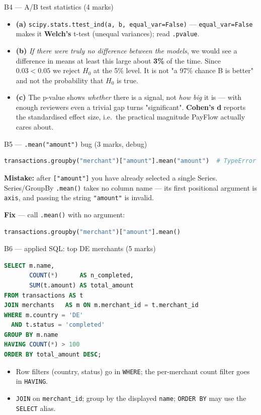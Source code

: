 \documentclass[aspectratio=169,11pt]{beamer}
\begin{document}
\begin{frame}[fragile]{B4 --- A/B test statistics \hfill (4 marks)}
\begin{itemize}
  \item \textbf{(a)} \texttt{scipy.stats.ttest\_ind(a, b, equal\_var=False)} --- \texttt{equal\_var=False} makes it \textbf{Welch's} t-test (unequal variances); read \texttt{.pvalue}.
  \item \textbf{(b)} \emph{If there were truly no difference between the models}, we would see a difference in means at least this large about \textbf{3\%} of the time. Since $0.03 < 0.05$ we reject $H_0$ at the 5\% level. It is \textcolor{cred}{not} "a 97\% chance B is better" and not the probability that $H_0$ is true.
  \item \textbf{(c)} The p-value shows \emph{whether} there is a signal, not \emph{how big} it is --- with enough reviewers even a trivial gap turns "significant". \textbf{Cohen's d} reports the standardised effect size, i.e.\ the practical magnitude PayFlow actually cares about.
\end{itemize}
\end{frame}

\begin{frame}[fragile]{B5 --- \texttt{.mean("amount")} bug \hfill (3 marks, debug)}
\begin{lstlisting}[language=Python]
transactions.groupby("merchant")["amount"].mean("amount")  # TypeError
\end{lstlisting}
\textbf{Mistake:} after \texttt{["amount"]} you have already selected a single Series. Series/GroupBy \texttt{.mean()} takes no column name --- its first positional argument is \texttt{axis}, and passing the string \texttt{"amount"} is invalid.
\medskip

\textbf{Fix} --- call \texttt{.mean()} with no argument:
\begin{lstlisting}[language=Python]
transactions.groupby("merchant")["amount"].mean()
\end{lstlisting}
\end{frame}

\begin{frame}[fragile]{B6 --- applied SQL: top DE merchants \hfill (5 marks)}
\begin{lstlisting}[language=SQL]
SELECT m.name,
       COUNT(*)      AS n_completed,
       SUM(t.amount) AS total_amount
FROM transactions AS t
JOIN merchants   AS m ON m.merchant_id = t.merchant_id
WHERE m.country = 'DE'
  AND t.status = 'completed'
GROUP BY m.name
HAVING COUNT(*) > 100
ORDER BY total_amount DESC;
\end{lstlisting}
\begin{itemize}\footnotesize
  \item Row filters (country, status) go in \texttt{WHERE}; the per-merchant count filter goes in \texttt{HAVING}.
  \item \texttt{JOIN} on \texttt{merchant\_id}; group by the displayed \texttt{name}; \texttt{ORDER BY} may use the \texttt{SELECT} alias.
\end{itemize}
\end{frame}
\end{document}
